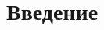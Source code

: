 \documentclass[a4paper, 14pt]{extarticle}
\begin{document}
\tableofcontents

\newpage

\setcounter{secnumdepth}{-1}

\section{Введение}

\makeatletter 
\renewcommand*{\@biblabel}[1]{\hfill#1.} 
\makeatother

\begin{thebibliography}{0}

\end{thebibliography}
\end{document}
